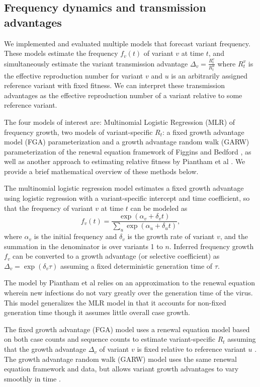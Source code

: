 \subsection*{Frequency dynamics and transmission advantages}

We implemented and evaluated multiple models that forecast variant frequency.
These models estimate the frequency $f_{v}(t)$ of variant $v$ at time $t$, and simultaneously estimate the variant transmission advantage $\Delta_{v} = \frac{R_{t}^{v}}{R_{t}^{u}}$ where $R_{t}^{v}$ is the effective reproduction number for variant $v$ and $u$ is an arbitrarily assigned reference variant with fixed fitness.
We can interpret these transmission advantages as the effective reproduction number of a variant relative to some reference variant.

The four models of interest are: Multinomial Logistic Regression (MLR) of frequency growth, two models of variant-specific $R_t$: a fixed growth advantage model (FGA) parameterization and a growth advantage random walk (GARW) parameterization of the renewal equation framework of Figgins and Bedford \cite{figgins2022sars}, as well as another approach to estimating relative fitness by Piantham et al \cite{piantham2021estimating}.
We provide a brief mathematical overview of these methods below.

The multinomial logistic regression model estimates a fixed growth advantage using logistic regression with a variant-specific intercept and time coefficient, so that the frequency of variant $v$ at time $t$ can be modeled as
\begin{equation}
    f_{v}(t) = \frac{\exp(\alpha_{v} + \delta_{v} t)}{\sum_{u} \exp(\alpha_{u} + \delta_{u} t)},
\end{equation}
where $\alpha_v$ is the initial frequency and $\delta_v$ is the growth rate of variant $v$, and the summation in the denominator is over variants 1 to $n$.
Inferred frequency growth $f_v$ can be converted to a growth advantage (or selective coefficient) as $\Delta_{v} = \exp(\delta_{v} \tau)$ assuming a fixed deterministic  generation time of $\tau$.

The model by Piantham et al \cite{piantham2021estimating} relies on an approximation to the renewal equation wherein new infections do not vary greatly over the generation time of the virus.
This model generalizes the MLR model in that it accounts for non-fixed generation time though it assumes little overall case growth.

The fixed growth advantage (FGA) model uses a renewal equation model based on both case counts and sequence counts to estimate variant-specific $R_t$ assuming that the growth advantage $\Delta_{v}$ of variant $v$ is fixed relative to reference variant $u$ \cite{figgins2022sars}.
The growth advantage random walk (GARW) model uses the same renewal equation framework and data, but allows variant growth advantages to vary smoothly in time \cite{figgins2022sars}.

